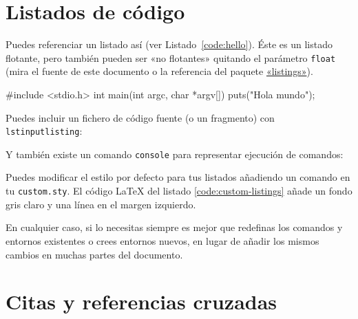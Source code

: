 \section{Listados de código}
\label{sec:listado}

Puedes referenciar un listado así (ver Listado~\ref{code:hello}). Éste es un
listado flotante, pero también pueden ser «no flotantes» quitando el parámetro
\texttt{float} (mira el fuente de este documento o la referencia del paquete
\href{http://www.ctan.org/get/macros/latex/contrib/listings/listings.pdf}{«listings»}).

\begin{listing}[
  float=ht,
  language = C,
  caption  = {«Hola mundo» en C},
  label    = code:hello]
#include <stdio.h>
int main(int argc, char *argv[]) {
    puts("Hola mundo\n");
}
\end{listing}

\noindent
Puedes incluir un fichero de código fuente (o un fragmento) con \texttt{lstinputlisting}:



\noindent
Y también existe un comando \texttt{console} para representar ejecución de
comandos:


Puedes modificar el estilo por defecto para tus listados añadiendo un comando
 en tu \texttt{custom.sty}. El código \LaTeX{} del listado
\ref{code:custom-listings} añade un fondo gris claro y una línea en el margen
izquierdo.

\begin{listing}[
  float=h!,
  caption  = {Personalizando los listados de código},
  label    = code:custom-listings]
\end{listing}

En cualquier caso, si lo necesitas siempre es mejor que redefinas los comandos y entornos
existentes o crees entornos nuevos, en lugar de añadir los mismos cambios en
muchas partes del documento.


\section{Citas y referencias cruzadas}

